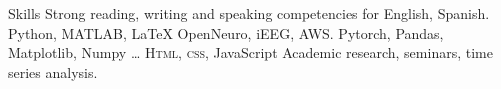 
\begin{rubric}{Skills}
\entry*[Languages]
	Strong reading, writing and speaking competencies for English, Spanish.
	Python, MATLAB, \LaTeX
{}
	OpenNeuro, iEEG, AWS. Pytorch, Pandas, Matplotlib, Numpy \dots
{}
	\textsc{Html, css}, JavaScript
\entry*[Misc.]
	Academic research, seminars, time series analysis.
\end{rubric}
